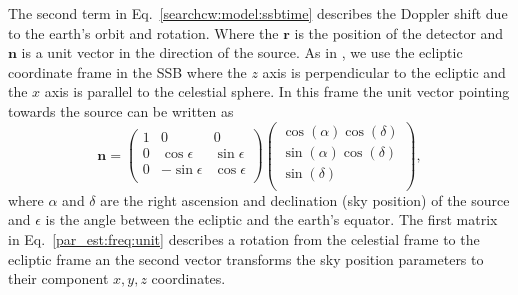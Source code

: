 The second term in Eq.~\ref{searchcw:model:ssbtime} describes the Doppler shift
due to the earth's orbit and rotation.  Where the $\bm{r}$ is the position of
the detector and $\bm{n}$ is a unit vector in the direction of the source.  As
in \citep{schutz1998DataAnalysis}, we use the ecliptic coordinate frame in the \gls{SSB}
where the $z$ axis is perpendicular to the ecliptic and the $x$ axis is
parallel to the celestial sphere.  In this frame the unit vector pointing
towards the source can be written as
%
\begin{equation}
    \label{par_est:freq:unit}
    \bm{n} = 
    \left(
    \begin{matrix}
        1 & 0 & 0  \\
        0 & \cos \epsilon & \sin \epsilon \\
        0 & -\sin \epsilon & \cos \epsilon \\
    \end{matrix} \right)
    \left(
    \begin{matrix}
        \cos(\alpha)\cos(\delta)  \\
        \sin(\alpha)\cos(\delta) \\
        \sin(\delta) \\
    \end{matrix} \right),
\end{equation}
%
where $\alpha$ and $\delta$ are the right ascension and declination (sky
position) of the source and $\epsilon$ is the angle between the ecliptic and
the earth's equator.  The first matrix in Eq.~\ref{par_est:freq:unit} describes
a rotation from the celestial frame to
the ecliptic frame an the second vector transforms the sky position parameters to their component
$x,y,z$ coordinates.

